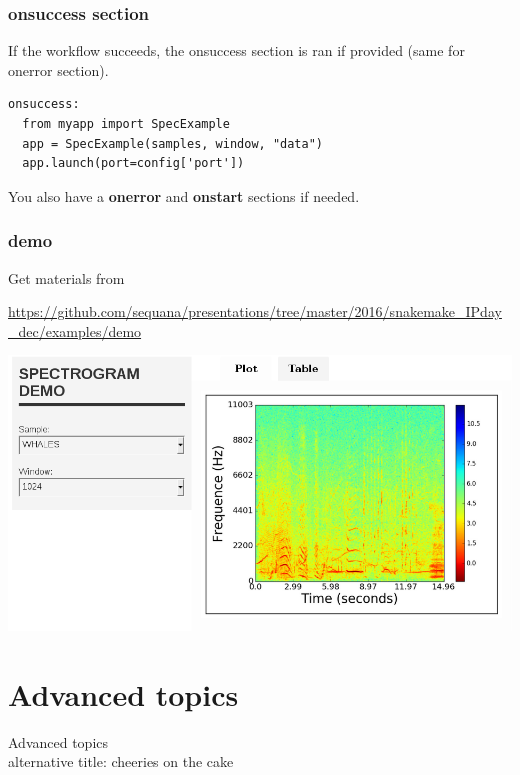 \documentclass{beamer}
\begin{document}

\begin{frame}[fragile]
    \frametitle{onsuccess section}    
    If the workflow succeeds, the onsuccess section is ran if provided
    (same for onerror section).

    \begin{block}{}
    \begin{lstlisting}[basicstyle=\large]
onsuccess:
  from myapp import SpecExample
  app = SpecExample(samples, window, "data")
  app.launch(port=config['port'])
    \end{lstlisting}
    \end{block}
    
    You also have a \textbf{onerror} and \textbf{onstart} sections if needed.
\end{frame}


\begin{frame}[fragile]
\frametitle{demo}
Get materials from  

\url{https://github.com/sequana/presentations/tree/master/2016/snakemake_IPday_dec/examples/demo}
\begin{block}{}
 \includegraphics[scale=0.32]{images/results.png}
\end{block}
\end{frame}




\section{Advanced topics}
\begin{frame}[plain]
 \centering
 \begin{Huge}
Advanced topics 
\\
\large{alternative title: cheeries on the cake}
\end{Huge}
\end{frame}
\end{document}
